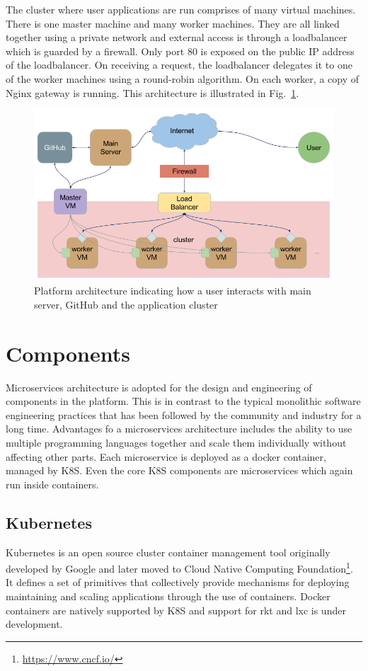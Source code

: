 \documentclass[DD]{iitmdiss}
\begin{document}
The cluster where user applications are run comprises of many virtual machines. There is one master machine and many worker machines. They are all linked together using a private network and external access is through a loadbalancer which is guarded by a firewall. Only port 80 is exposed on the public IP address of the loadbalancer. On receiving a request, the loadbalancer delegates it to one of the worker machines using a round-robin algorithm. On each worker, a copy of Nginx gateway is running. This architecture is illustrated in Fig.~\ref{fig:systemarch}. 

\begin{figure}
\centering
\includegraphics[width=0.9\linewidth]{img/system_arch}
\caption[Platform architecture]{Platform architecture indicating how a user interacts with main server, GitHub and the application cluster}
\label{fig:systemarch}
\end{figure}

\section{Components}
Microservices architecture \citep{dragoni_microservices:_2016} is adopted for the design and engineering of components in the platform. This is in contrast to the typical monolithic software engineering practices that has been followed by the community and industry for a long time. Advantages fo a microservices architecture includes the ability to use multiple programming languages together and scale them individually without affecting other parts. Each microservice is deployed as a docker container, managed by K8S. Even the core K8S components are microservices which again run inside containers.

\subsection{Kubernetes}
Kubernetes is an open source cluster container management tool originally developed by Google \citep{burns_borg_2016} and later moved to Cloud Native Computing Foundation\footnote{\url{https://www.cncf.io/}}. It defines a set of primitives that collectively provide mechanisms for deploying maintaining and scaling applications through the use of containers. Docker containers are natively supported by K8S and support for rkt and lxc is under development.
\end{document}
